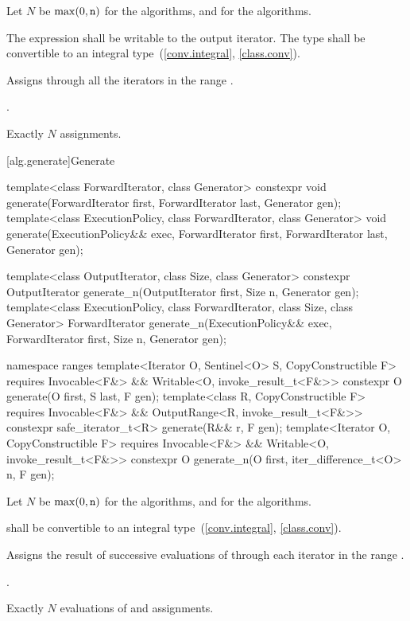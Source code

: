 \begin{itemdescr}
\pnum
Let $N$ be $\max(0, \texttt{n})$ for the  algorithms, and
 for the  algorithms.

\pnum
\requires
The expression
shall be writable to the output iterator. The type
shall be convertible to an integral type~(\ref{conv.integral}, \ref{class.conv}).

\pnum
\effects
Assigns  through all the iterators in the range .

\pnum
\returns {}.

\pnum
\complexity
Exactly $N$ assignments.
\end{itemdescr}

[alg.generate]{Generate}

%
%
\begin{itemdecl}
template<class ForwardIterator, class Generator>
  constexpr void generate(ForwardIterator first, ForwardIterator last,
                          Generator gen);
template<class ExecutionPolicy, class ForwardIterator, class Generator>
  void generate(ExecutionPolicy&& exec,
                ForwardIterator first, ForwardIterator last,
                Generator gen);

template<class OutputIterator, class Size, class Generator>
  constexpr OutputIterator generate_n(OutputIterator first, Size n, Generator gen);
template<class ExecutionPolicy, class ForwardIterator, class Size, class Generator>
  ForwardIterator generate_n(ExecutionPolicy&& exec,
                             ForwardIterator first, Size n, Generator gen);

namespace ranges {
  template<Iterator O, Sentinel<O> S, CopyConstructible F>
      requires Invocable<F&> && Writable<O, invoke_result_t<F&>>
    constexpr O generate(O first, S last, F gen);
  template<class R, CopyConstructible F>
      requires Invocable<F&> && OutputRange<R, invoke_result_t<F&>>
    constexpr safe_iterator_t<R> generate(R&& r, F gen);
  template<Iterator O, CopyConstructible F>
      requires Invocable<F&> && Writable<O, invoke_result_t<F&>>
    constexpr O generate_n(O first, iter_difference_t<O> n, F gen);
}
\end{itemdecl}

\begin{itemdescr}
\pnum
Let $N$ be $\max(0, \texttt{n})$ for the  algorithms, and
 for the  algorithms.

\pnum
\requires
{}
shall be convertible to an integral type~(\ref{conv.integral}, \ref{class.conv}).

\pnum
\effects
Assigns the result of successive evaluations of 
through each iterator in the range .

\pnum
\returns
{}.

\pnum
\complexity
Exactly $N$ evaluations of  and assignments.
\end{itemdescr}

